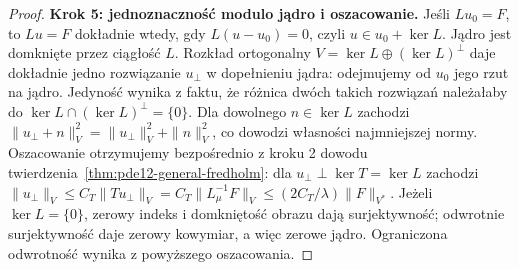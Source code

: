 \begin{proof}
\textbf{Krok 5: jednoznaczność modulo jądro i oszacowanie.}
Jeśli $Lu_0=F$, to $Lu=F$ dokładnie wtedy, gdy
$L(u-u_0)=0$, czyli $u\in u_0+\ker L$.
Jądro jest domknięte przez ciągłość $L$.
Rozkład ortogonalny $V=\ker L\oplus(\ker L)^\perp$
daje dokładnie jedno rozwiązanie $u_\perp$ w dopełnieniu
jądra: odejmujemy od $u_0$ jego rzut na jądro.
Jedyność wynika z faktu, że różnica dwóch takich rozwiązań
należałaby do $\ker L\cap(\ker L)^\perp=\{0\}$.
Dla dowolnego $n\in\ker L$ zachodzi
$\|u_\perp+n\|_V^2=\|u_\perp\|_V^2+\|n\|_V^2$,
co dowodzi własności najmniejszej normy.
Oszacowanie otrzymujemy bezpośrednio z kroku 2
dowodu twierdzenia~\ref{thm:pde12-general-fredholm}:
dla $u_\perp\perp\ker T=\ker L$ zachodzi
$\|u_\perp\|_V\le C_T\|Tu_\perp\|_V
=C_T\|L_\mu^{-1}F\|_V\le(2C_T/\lambda)\|F\|_{V^*}$.
Jeżeli $\ker L=\{0\}$, zerowy indeks i domkniętość obrazu
dają surjektywność; odwrotnie surjektywność daje zerowy
kowymiar, a więc zerowe jądro. Ograniczona odwrotność
wynika z powyższego oszacowania.
\end{proof}

